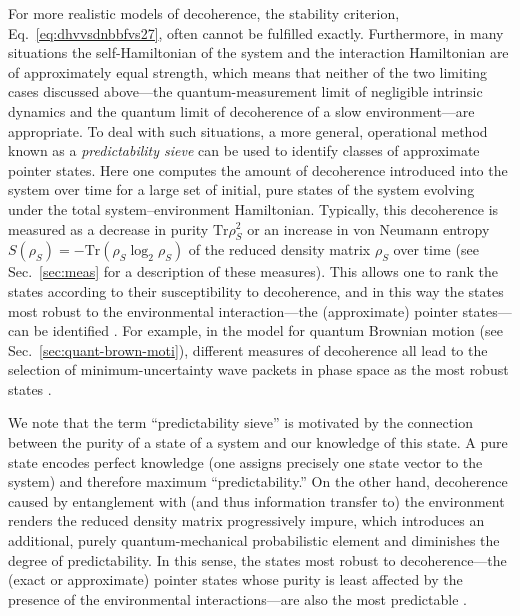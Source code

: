 \documentclass[3p,sort&compress,12pt]{elsarticle}
\newcommand{\op}[1]{#1}
\begin{document}
For more realistic models of decoherence, the stability criterion, Eq.~\eqref{eq:dhvvsdnbbfvs27}, often cannot be fulfilled exactly. Furthermore, in many situations the self-Hamiltonian of the system and the interaction Hamiltonian are of approximately equal strength, which means that neither of the two limiting cases discussed above---the quantum-measurement limit of negligible intrinsic dynamics and the quantum limit of decoherence of a slow environment---are appropriate. To deal with such situations, a more general, operational method known as a \emph{predictability sieve} \cite{Zurek:1993:pu,Zurek:1993:qq,Zurek:1998:re} can be used to identify classes of approximate pointer states. Here one computes the amount of decoherence introduced into the system over time for a large set of initial, pure states of the system evolving under the total system--environment Hamiltonian. Typically, this decoherence is measured as a decrease in purity $\text{Tr} \op{\rho}_S^2$ or an increase in  von Neumann entropy $S(\op{\rho}_S) = - \text{Tr}\left( \op{\rho}_S \log_2 \op{\rho}_S \right)$ of the reduced density matrix $\op{\rho}_S$ over time (see Sec.~\ref{sec:meas} for a description of these measures). This allows one to rank the states according to their susceptibility to decoherence, and in this way the states most robust to the environmental interaction---the (approximate) pointer states---can be identified \cite{Zurek:1993:pu,Zurek:1993:qq,Zurek:1998:re,Zurek:2002:ii}. For example, in the model for quantum Brownian motion (see Sec.~\ref{sec:quant-brown-moti}), different measures of decoherence all lead to the selection of minimum-uncertainty wave packets in phase space as the most robust states \cite{Kubler:1973:ux,Zurek:1993:pu,Zurek:2002:ii,Diosi:2000:yn,Joos:2003:jh,Eisert:2003:ib}.

We note that the term ``predictability sieve'' is motivated by the connection between the purity of a state of a system and our knowledge of this state. A pure state encodes perfect knowledge (one assigns precisely one state vector to the system) and therefore maximum ``predictability.''  On the other hand, decoherence caused by entanglement with (and thus information transfer to) the environment renders the reduced density matrix progressively impure, which introduces an additional, purely quantum-mechanical probabilistic element and diminishes the degree of predictability.  In this sense, the states most robust to decoherence---the (exact or approximate) pointer states  whose purity is least affected by the presence of the environmental interactions---are also the most predictable \cite{Zurek:1993:pu,Zurek:1993:qq,Zurek:1998:re}.
\end{document}
